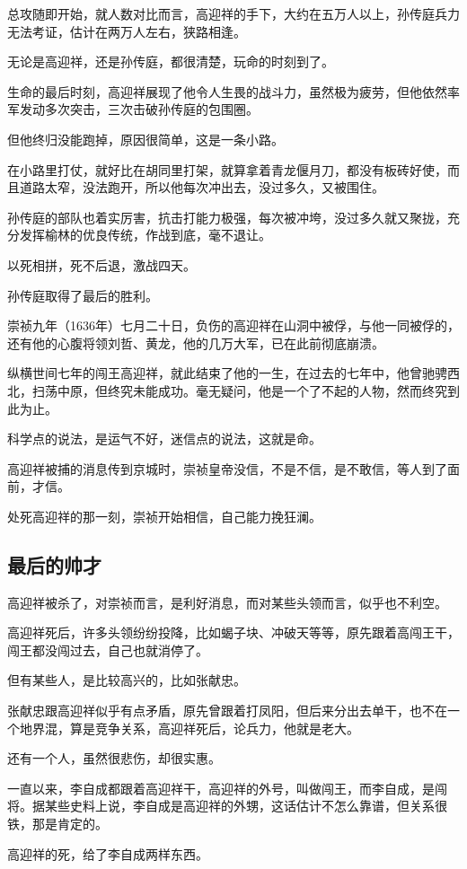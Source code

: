 \begin{multicols}{\theparacolNo}
总攻随即开始，就人数对比而言，高迎祥的手下，大约在五万人以上，孙传庭兵力无法考证，估计在两万人左右，狭路相逢。

无论是高迎祥，还是孙传庭，都很清楚，玩命的时刻到了。

生命的最后时刻，高迎祥展现了他令人生畏的战斗力，虽然极为疲劳，但他依然率军发动多次突击，三次击破孙传庭的包围圈。

但他终归没能跑掉，原因很简单，这是一条小路。

在小路里打仗，就好比在胡同里打架，就算拿着青龙偃月刀，都没有板砖好使，而且道路太窄，没法跑开，所以他每次冲出去，没过多久，又被围住。

孙传庭的部队也着实厉害，抗击打能力极强，每次被冲垮，没过多久就又聚拢，充分发挥榆林的优良传统，作战到底，毫不退让。

以死相拼，死不后退，激战四天。

孙传庭取得了最后的胜利。

崇祯九年（1636年）七月二十日，负伤的高迎祥在山洞中被俘，与他一同被俘的，还有他的心腹将领刘哲、黄龙，他的几万大军，已在此前彻底崩溃。

纵横世间七年的闯王高迎祥，就此结束了他的一生，在过去的七年中，他曾驰骋西北，扫荡中原，但终究未能成功。毫无疑问，他是一个了不起的人物，然而终究到此为止。

科学点的说法，是运气不好，迷信点的说法，这就是命。

高迎祥被捕的消息传到京城时，崇祯皇帝没信，不是不信，是不敢信，等人到了面前，才信。

处死高迎祥的那一刻，崇祯开始相信，自己能力挽狂澜。

\subsection{最后的帅才}
高迎祥被杀了，对崇祯而言，是利好消息，而对某些头领而言，似乎也不利空。

高迎祥死后，许多头领纷纷投降，比如蝎子块、冲破天等等，原先跟着高闯王干，闯王都没闯过去，自己也就消停了。

但有某些人，是比较高兴的，比如张献忠。

张献忠跟高迎祥似乎有点矛盾，原先曾跟着打凤阳，但后来分出去单干，也不在一个地界混，算是竞争关系，高迎祥死后，论兵力，他就是老大。

还有一个人，虽然很悲伤，却很实惠。

一直以来，李自成都跟着高迎祥干，高迎祥的外号，叫做闯王，而李自成，是闯将。据某些史料上说，李自成是高迎祥的外甥，这话估计不怎么靠谱，但关系很铁，那是肯定的。

高迎祥的死，给了李自成两样东西。


\end{multicols}
